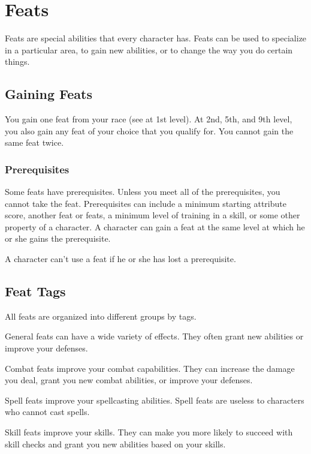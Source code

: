 \chapter{Feats}\label{Feats}

Feats are special abilities that every character has.
Feats can be used to specialize in a particular area, to gain new abilities, or to change the way you do certain things.

\section{Gaining Feats}
    You gain one feat from your race (see  at 1st level).
    At 2nd, 5th, and 9th level, you also gain any feat of your choice that you qualify for.
    You cannot gain the same feat twice.

    \subsection{Prerequisites}
        Some feats have prerequisites.
        Unless you meet all of the prerequisites, you cannot take the feat.
        Prerequisites can include a minimum starting attribute score, another feat or feats, a minimum level of training in a skill, or some other property of a character.
        A character can gain a feat at the same level at which he or she gains the prerequisite.

        A character can't use a feat if he or she has lost a prerequisite.

\section{Feat Tags}
    All feats are organized into different groups by tags.

     General feats can have a wide variety of effects.
    They often grant new abilities or improve your defenses.

     Combat feats improve your combat capabilities.
    They can increase the damage you deal, grant you new combat abilities, or improve your defenses.

     Spell feats improve your spellcasting abilities.
    Spell feats are useless to characters who cannot cast spells.

     Skill feats improve your skills.
    They can make you more likely to succeed with skill checks and grant you new abilities based on your skills.

